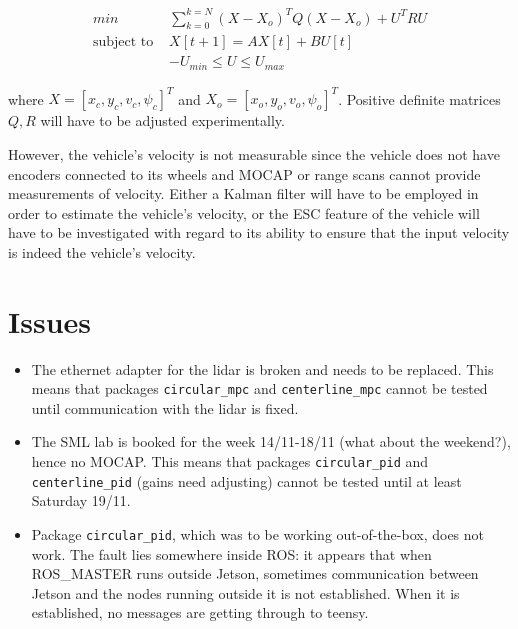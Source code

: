\documentclass[oneside,12pt]{article}
\begin{document}
\begin{itemize}
    \begin{align}
      min &\sum\limits_{k=0}^{k=N} (X-X_o)^T Q (X-X_o) + U^T R U \\
      \text{subject to } & X[t+1] = A X[t] + B U[t] \\
      & -U_{min} \leq U \leq U_{max}
    \end{align}

    where $X=[x_c, y_c, v_c, \psi_c]^T$ and $X_o = [x_o, y_o, v_o, \psi_o]^T$.
    Positive definite matrices $Q,R$ will have to be adjusted experimentally.

    However, the vehicle's velocity is not measurable since the vehicle does not
    have encoders connected to its wheels and MOCAP or range scans cannot
    provide measurements of velocity. Either a Kalman filter will have to be
    employed in order to estimate the vehicle's velocity, or the ESC feature of
    the vehicle will have to be investigated with regard to its ability to
    ensure that the input velocity is indeed the vehicle's velocity.
\end{itemize}



\section{Issues}

\begin{itemize}
  \item The ethernet adapter for the lidar is broken and needs to be replaced.
    This means that packages \texttt{circular\_mpc} and \texttt{centerline\_mpc}
    cannot be tested until communication with the lidar is fixed.
  \item The SML lab is booked for the week 14/11-18/11 (what about the weekend?),
    hence no MOCAP. This means that packages \texttt{circular\_pid} and
    \texttt{centerline\_pid} (gains need adjusting) cannot be tested until at
    least Saturday 19/11.
  \item Package \texttt{circular\_pid}, which was to be working out-of-the-box,
    does not work. The fault lies somewhere inside ROS: it appears that when
    ROS\_MASTER runs outside Jetson, sometimes communication between Jetson and the
    nodes running outside it is not established. When it is established, no
    messages are getting through to teensy.
\end{itemize}
\end{document}
